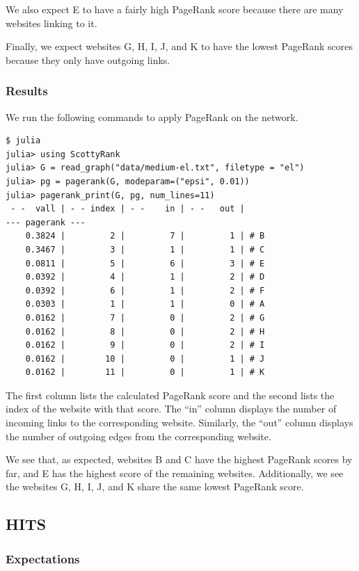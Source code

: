 \documentclass[12pt, titlepage, twoside]{amsart}
\begin{document}
We also expect E to have a fairly high PageRank score because there are many websites linking to it.

Finally, we expect websites G, H, I, J, and K to have the lowest PageRank scores because they only have outgoing links.

\subsubsection{Results}

We run the following commands to apply PageRank on the network.

\begin{verbatim}
$ julia
julia> using ScottyRank
julia> G = read_graph("data/medium-el.txt", filetype = "el")
julia> pg = pagerank(G, modeparam=("epsi", 0.01))
julia> pagerank_print(G, pg, num_lines=11)
 - -  vall | - - index | - -    in | - -   out |
--- pagerank ---
    0.3824 |         2 |         7 |         1 | # B
    0.3467 |         3 |         1 |         1 | # C
    0.0811 |         5 |         6 |         3 | # E
    0.0392 |         4 |         1 |         2 | # D
    0.0392 |         6 |         1 |         2 | # F
    0.0303 |         1 |         1 |         0 | # A
    0.0162 |         7 |         0 |         2 | # G
    0.0162 |         8 |         0 |         2 | # H
    0.0162 |         9 |         0 |         2 | # I
    0.0162 |        10 |         0 |         1 | # J
    0.0162 |        11 |         0 |         1 | # K
\end{verbatim}

The first column lists the calculated PageRank score and
the second lists the index of the website with that score.
The ``in'' column displays the number of incoming links to the corresponding website.
Similarly, the ``out'' column displays the number of outgoing edges from the corresponding website.

We see that, as expected, websites B and C have the highest PageRank scores by far,
and E has the highest score of the remaining websites.
Additionally, we see the websites G, H, I, J, and K share the same lowest PageRank score.

\subsection{HITS}

\subsubsection{Expectations}
\end{document}

